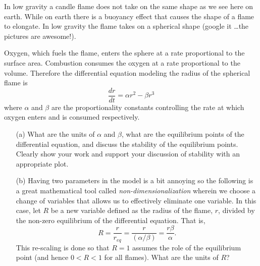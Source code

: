 \begin{problem}
    In low gravity a candle flame does not take on the same shape as we see here on earth.
    While on earth there is a buoyancy effect that causes the shape of a flame to
    elongate.  In low gravity the flame takes on a spherical shape (google it \ldots the
    pictures are awesome!).  

    Oxygen, which fuels the flame, enters the sphere at a rate proportional to the surface
    area.  Combustion consumes the oxygen at a rate proportional to the volume.  Therefore
    the differential equation modeling the radius of the spherical flame is
    \[ \frac{dr}{dt} = \alpha r^2 - \beta r^3 \]
    where $\alpha$ and $\beta$ are the proportionality constants controlling the rate at
    which oxygen enters and is consumed respectively.
    \begin{enumerate}
        \item[(a)] What are the units of $\alpha$ and $\beta$, what are the equilibrium
            points of the differential equation, and discuss the stability of the
            equilibrium points. Clearly show your work and support your discussion of
            stability with an appropriate plot.
        \item[(b)] Having two parameters in the model is a bit annoying so the following
            is a great mathematical tool called {\it non-dimensionalization} wherein we
            choose a change of variables that allows us to effectively eliminate one
            variable.  In this case, let $R$ be a new variable defined as the radius of
            the flame, $r$, divided by the non-zero equilibrium of the differential
            equation.  That is,
            \[ R = \frac{r}{r_{eq}} = \frac{r}{(\alpha / \beta)} = \frac{r \beta}{\alpha}.
            \]
            This re-scaling is done so that $R = 1$ assumes the role of the equilibrium
            point (and hence $0 < R < 1$ for all flames).  What are the units of $R$?
            

\end{enumerate}
\end{problem}
